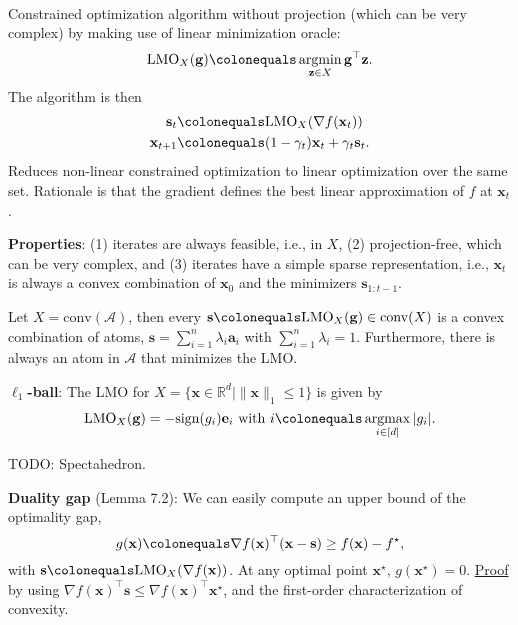 \documentclass{article}
\DeclareMathOperator*{\argmax}{argmax}
\DeclareMathOperator*{\argmin}{argmin}
\newcommand{\R}{\mathbb{R}}
\renewcommand{\vec}[1]{\mathbf{#1}}
\newcommand{\transpose}[1]{#1^\top}
\newenvironment{topic}[1]
{\textbf{\sffamily \colorbox{black}{\rlap{\textbf{\textcolor{white}{#1}}}\hspace{\linewidth}\hspace{-2\fboxsep}}} \\ \vspace{0.2cm}}
{}
\begin{document}
\begin{multicols*}{2}
    \begin{topic}{7 The Frank-Wolfe algorithm}
        Constrained optimization algorithm without projection (which can be very complex) by making
        use of linear minimization oracle: \[
            \mathrm{LMO}_X(\vec{g}) \colonequals \argmin_{\vec{z} \in X} \transpose{\vec{g}} \vec{z}.
        \]
        The algorithm is then
        \begin{align*}
            \vec{s}_t     & \colonequals \mathrm{LMO}_X(\nabla f(\vec{x}_t))            \\
            \vec{x}_{t+1} & \colonequals (1 - \gamma_t) \vec{x}_t + \gamma_t \vec{s}_t.
        \end{align*}
        Reduces non-linear constrained optimization to linear optimization over the same set.
        Rationale is that the gradient defines the best linear approximation of $f$ at $\vec{x}_t$.

        \textbf{Properties}: (1) iterates are always feasible, i.e., in $X$, (2) projection-free, which can be
        very complex, and (3) iterates have a simple sparse representation, i.e., $\vec{x}_t$ is
        always a convex combination of $\vec{x}_0$ and the minimizers $\vec{s}_{1:t-1}$.

        Let $X = \mathrm{conv}(\mathcal{A})$, then every $\vec{s} \colonequals \mathrm{LMO}_X(\vec{g}) \in
            \mathrm{conv}(X)$ is a convex combination of atoms, $\vec{s} = \sum_{i=1}^{n} \lambda_i \vec{a}_i$
        with $\sum_{i=1}^{n} \lambda_i = 1$. Furthermore, there is always an atom in $\mathcal{A}$ that
        minimizes the LMO.

        \textbf{$\ell_1$-ball}: The LMO for $X = \{ \vec{x} \in \R^d \mid \| \vec{x} \|_1 \leq 1 \}$ is given by \[
            \mathrm{LMO}_X(\vec{g}) = -\mathrm{sign}(g_i) \vec{e}_i \text{ with } i \colonequals \argmax_{i \in [d]} | g_i |.
        \]

        TODO: Spectahedron.

        \textbf{Duality gap} (Lemma 7.2): We can easily compute an upper bound of the optimality gap, \[
            g(\vec{x}) \colonequals \transpose{\nabla f(\vec{x})} (\vec{x} - \vec{s}) \geq f(\vec{x}) - f^\star,
        \]
        with $\vec{s} \colonequals \mathrm{LMO}_X(\nabla f(\vec{x}))$. At any optimal point
        $\vec{x}^\star$, $g(\vec{x}^\star) = 0$. \underline{Proof} by using $\transpose{\nabla f(\vec{x})}
            \vec{s} \leq \transpose{\nabla f(\vec{x})} \vec{x}^\star$, and the first-order characterization of
        convexity.


\end{topic}
\end{multicols*}
\end{document}
